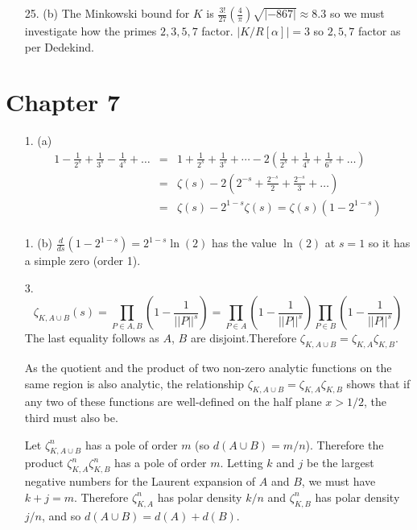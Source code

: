 \documentclass{article}
\newcommand{\z}[0]{\zeta}
\begin{document}
\begin{enumerate}
    \item [25. (b)] The Minkowski bound for $K$ is $\frac{3!}{27}\left ( \frac{4}{\pi}\right){\sqrt{|-867|}} \approx 8.3$ so we must investigate how the primes $2, 3, 5, 7$ factor. $|K / R[\alpha]| = 3$ so $2, 5, 7$ factor as per Dedekind.

\end{enumerate}

\section*{Chapter 7}

\begin{enumerate}
    \item [1. (a)]
    \begin{eqnarray*}
        1 - \frac{1}{2^s} + \frac{1}{3^s} - \frac{1}{4^s} + \ldots &=& 1 + \frac{1}{2^s} + \frac{1}{3^s} + \cdots - 2 \left( \frac{1}{2^s} + \frac{1}{4^s} + \frac{1}{6^s} + \ldots \right) \\
        &=& \zeta(s) - 2\left(2^{-s} + \frac{2^{-s}}{2} + \frac{2^{-s}}{3} + \ldots \right) \\
        &=& \zeta(s) - 2^{1-s}\zeta(s) = \zeta(s) (1 - 2^{1-s}) \\
    \end{eqnarray*}
    \item [1. (b)]
        $\frac{d}{ds} (1 - 2^{1-s}) = 2^{1-s} \ln (2)$ has the value $\ln(2)$ at $s = 1$ so it has a simple zero (order 1).
    \item [3.]
    \[ \z_{K, A \cup B}(s) = \prod_{P \in A, B} \left(1 - \frac{1}{||P||^{s}}\right) = \prod_{P \in A} \left(1 - \frac{1}{||P||^{s}}\right) \prod_{P \in B} \left(1 - \frac{1}{||P||^{s}}\right) \] The last equality follows as $A$, $B$ are disjoint.Therefore $\z_{K, A \cup B} = \z_{K, A} \z_{K, B}$.

    As the quotient and the product of two non-zero analytic functions on the same region is also analytic, the relationship $\z_{K, A \cup B} = \z_{K, A} \z_{K, B}$ shows that if any two of these functions are well-defined on the half plane $x > 1/2$, the third must also be.

    Let $\z_{K, A \cup B}^{n}$ has a pole of order $m$ (so $d(A \cup B) = m /n$).  Therefore the product $\z_{K, A}^{n} \z_{K, B}^{n}$ has a pole of order $m$.  Letting $k$ and $j$ be the largest negative numbers for the Laurent expansion of $A$ and $B$, we must have $k + j = m$.  Therefore $\z_{K, A}^{n}$ has polar density $k / n$ and $\z_{K, B}^{n}$ has polar density $j / n$, and so $d(A \cup B) = d(A) + d(B)$.


\end{enumerate}
\end{document}
